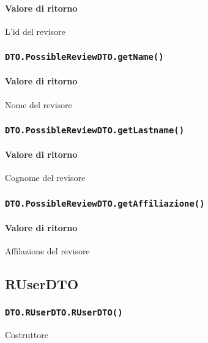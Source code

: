 \paragraph{Valore di ritorno}
\begin{description}
\item L'id del revisore
\end{description}
\subsubsection{\texttt{DTO.PossibleReviewDTO.getName()}}
\paragraph{Valore di ritorno}
\begin{description}
\item Nome del revisore
\end{description}
\subsubsection{\texttt{DTO.PossibleReviewDTO.getLastname()}}
\paragraph{Valore di ritorno}
\begin{description}
\item Cognome del revisore
\end{description}
\subsubsection{\texttt{DTO.PossibleReviewDTO.getAffiliazione()}}
\paragraph{Valore di ritorno}
\begin{description}
\item Affilazione del revisore
\end{description}

\subsection{RUserDTO}
\subsubsection{\texttt{DTO.RUserDTO.RUserDTO()}}
Costruttore
